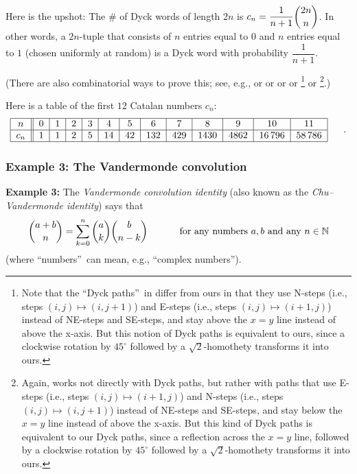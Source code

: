 Here is the upshot: The \# of Dyck words of length $2n$ is $c_{n}=\dfrac
{1}{n+1}\dbinom{2n}{n}$. In other words, a $2n$-tuple that consists of $n$
entries equal to $0$ and $n$ entries equal to $1$ (chosen uniformly at random)
is a Dyck word with probability $\dfrac{1}{n+1}$.

(There are also combinatorial ways to prove this; see, e.g., \cite[\S 7.5,
discussion at the end of Example 4]{GKP} or \cite[\S 1.6]{Stanle15} or
\cite{Martin-Dyck} or \cite[Lecture 29, Theorem 5.6.7]{22fco} or \cite[Theorem
1.56]{Loehr-BC}\footnote{Note that the \textquotedblleft Dyck
paths\textquotedblright\ in \cite{Loehr-BC} differ from ours in that they use
N-steps (i.e., steps $\left(  i,j\right)  \mapsto\left(  i,j+1\right)  $) and
E-steps (i.e., steps $\left(  i,j\right)  \mapsto\left(  i+1,j\right)  $)
instead of NE-steps and SE-steps, and stay above the $x=y$ line instead of
above the x-axis. But this notion of Dyck paths is equivalent to ours, since a
clockwise rotation by $45^{\circ}$ followed by a $\sqrt{2}$-homothety
transforms it into ours.} or \cite[\S 8.5, proofs of Identity 244]%
{Spivey19}\footnote{Again, \cite{Spivey19} works not directly with Dyck paths,
but rather with paths that use E-steps (i.e., steps $\left(  i,j\right)
\mapsto\left(  i+1,j\right)  $) and N-steps (i.e., steps $\left(  i,j\right)
\mapsto\left(  i,j+1\right)  $) instead of NE-steps and SE-steps, and stay
below the $x=y$ line instead of above the x-axis. But this kind of Dyck paths
is equivalent to our Dyck paths, since a reflection across the $x=y$ line,
followed by a clockwise rotation by $45^{\circ}$ followed by a $\sqrt{2}%
$-homothety transforms it into ours.}.)

Here is a table of the first $12$ Catalan numbers $c_{n}$:%
\[%
\begin{tabular}
[c]{|c||c|c|c|c|c|c|c|c|c|c|c|c|}\hline
$n$ & $0$ & $1$ & $2$ & $3$ & $4$ & $5$ & $6$ & $7$ & $8$ & $9$ & $10$ &
$11$\\\hline
$c_{n}$ & $1$ & $1$ & $2$ & $5$ & $14$ & $42$ & $132$ & $429$ & $1430$ &
$4862$ & $16\,796$ & $58\,786$\\\hline
\end{tabular}
\ \ \ \ \ .
\]


\subsubsection{Example 3: The Vandermonde convolution}

\textbf{Example 3:} The \emph{Vandermonde convolution identity} (also known as
the \emph{Chu--Vandermonde identity}) says that%
\[
\dbinom{a+b}{n}=\sum_{k=0}^{n}\dbinom{a}{k}\dbinom{b}{n-k}%
\ \ \ \ \ \ \ \ \ \ \text{for any numbers }a,b\text{ and any }n\in\mathbb{N}%
\]
(where \textquotedblleft numbers\textquotedblright\ can mean, e.g.,
\textquotedblleft complex numbers\textquotedblright).

